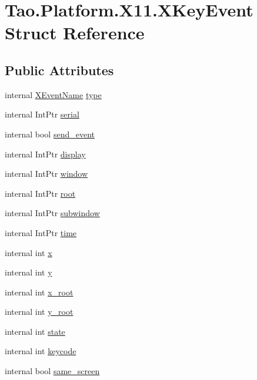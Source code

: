 \hypertarget{struct_tao_1_1_platform_1_1_x11_1_1_x_key_event}{
\section{Tao.Platform.X11.XKeyEvent Struct Reference}
\label{struct_tao_1_1_platform_1_1_x11_1_1_x_key_event}
}
\subsection*{Public Attributes}
\begin{DoxyCompactItemize}
\item 
internal \hyperlink{namespace_tao_1_1_platform_1_1_x11_aff81ed5b8778e1ea8e872861dff9f146}{XEventName} \hyperlink{struct_tao_1_1_platform_1_1_x11_1_1_x_key_event_a9f198e138849e679ebcf40dbdc913300}{type}
\item 
internal IntPtr \hyperlink{struct_tao_1_1_platform_1_1_x11_1_1_x_key_event_aa9d5446982b8c10b3df2f290810f7aee}{serial}
\item 
internal bool \hyperlink{struct_tao_1_1_platform_1_1_x11_1_1_x_key_event_a072c55da6b90068491c08c91421e1553}{send\_\-event}
\item 
internal IntPtr \hyperlink{struct_tao_1_1_platform_1_1_x11_1_1_x_key_event_a72b72d7ae15a51e66962ec26fe705810}{display}
\item 
internal IntPtr \hyperlink{struct_tao_1_1_platform_1_1_x11_1_1_x_key_event_aee42d71f83aff73693c6a1a0da0c6a7e}{window}
\item 
internal IntPtr \hyperlink{struct_tao_1_1_platform_1_1_x11_1_1_x_key_event_abc0efe8decfe9d296aa4f9edae8d213a}{root}
\item 
internal IntPtr \hyperlink{struct_tao_1_1_platform_1_1_x11_1_1_x_key_event_af50ce92097efebd5e19afc379fc92855}{subwindow}
\item 
internal IntPtr \hyperlink{struct_tao_1_1_platform_1_1_x11_1_1_x_key_event_a256182ce45974ffd0b50f80acc7fbfd0}{time}
\item 
internal int \hyperlink{struct_tao_1_1_platform_1_1_x11_1_1_x_key_event_ad121de653c56f6dd7265c6658d3d685f}{x}
\item 
internal int \hyperlink{struct_tao_1_1_platform_1_1_x11_1_1_x_key_event_a84bf8968a2eb8b29873e835aace88c82}{y}
\item 
internal int \hyperlink{struct_tao_1_1_platform_1_1_x11_1_1_x_key_event_aa99e7c8d47172a74b750f7ab289e1598}{x\_\-root}
\item 
internal int \hyperlink{struct_tao_1_1_platform_1_1_x11_1_1_x_key_event_a7c45b80c42f0cc1ad88cc2e99dbed910}{y\_\-root}
\item 
internal int \hyperlink{struct_tao_1_1_platform_1_1_x11_1_1_x_key_event_ab2875e2ea5cc03831548ef7e121066f2}{state}
\item 
internal int \hyperlink{struct_tao_1_1_platform_1_1_x11_1_1_x_key_event_a4ba2d316452aa2cab0c117ff23ea0ccd}{keycode}
\item 
internal bool \hyperlink{struct_tao_1_1_platform_1_1_x11_1_1_x_key_event_a0d5b9ebbb8043cb7f970d795f32fa61f}{same\_\-screen}
\end{DoxyCompactItemize}


